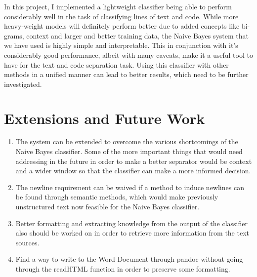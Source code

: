 \documentclass[12pt]{scrreprt}
\begin{document}
In this project, I implemented a lightweight classifier being able to perform considerably well in the task of classifying lines of text and code. While more heavy-weight models will definitely perform better due to added concepts like bi-grams, context and larger and better training data, the Naive Bayes system that we have used is highly simple and interpretable. This in conjunction with it's considerably good performance, albeit with many caveats, make it a useful tool to have for the text and code separation task. Using this classifier with other methods in a unified manner can lead to better results, which need to be further investigated. 


\chapter{Extensions and Future Work}

\begin{enumerate}
    \item The system can be extended to overcome the various shortcomings of the Naive Bayes classifier. Some of the more important things that would need addressing in the future in order to make a better separator would be context and a wider window so that the classifier can make a more informed decision.
    \item The newline requirement can be waived if a method to induce newlines can be found through semantic methods, which would make previously unstructured text now feasible for the Naive Bayes classifier. 
    \item Better formatting and extracting knowledge from the output of the classifier also should be worked on in order to retrieve more information from the text sources. 
    \item Find a way to write to the Word Document through pandoc without going through the readHTML function in order to preserve some formatting. 
\end{enumerate}
\end{document}

